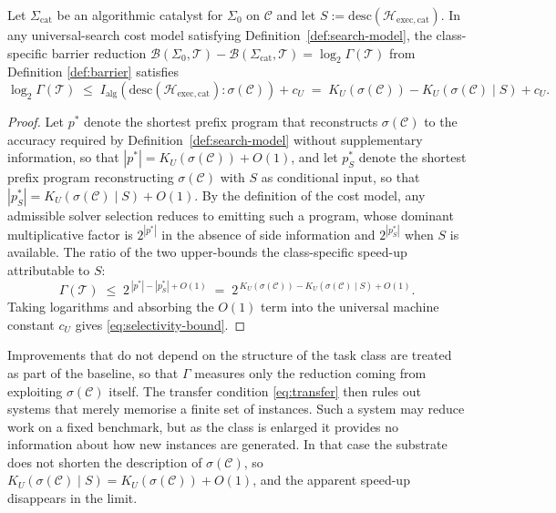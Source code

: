 \documentclass[runningheads]{llncs}
\newcommand{\Sys}{\Sigma}
\newcommand{\Hw}{\mathcal{H}}
\newcommand{\Task}{\mathcal{T}}
\newcommand{\Class}{\mathcal{C}}
\newcommand{\Barrier}{\mathcal{B}}
\newcommand{\descop}{\mathrm{desc}}
\newcommand{\MutInfo}{I_{\mathrm{alg}}}
\begin{document}
\begin{theorem}
\label{thm:selectivity}
Let $\Sys_{\mathrm{cat}}$ be an algorithmic catalyst for $\Sys_0$ on
$\Class$ and let $S:=\descop(\Hw_{\mathrm{exec,cat}})$. In any
universal-search cost model satisfying Definition~\ref{def:search-model},
the class-specific barrier reduction
$\Barrier(\Sys_0,\Task)-\Barrier(\Sys_{\mathrm{cat}},\Task)
= \log_2\Gamma(\Task)$ from Definition \ref{def:barrier} satisfies
\begin{equation}
\label{eq:selectivity-bound}
\log_2\Gamma(\Task)\;\le\;
\MutInfo(\descop(\Hw_{\mathrm{exec,cat}}):\sigma(\Class))+c_U
\;=\;K_U(\sigma(\Class))-K_U(\sigma(\Class)\mid S)+c_U.
\end{equation}
\end{theorem}
\begin{proof}
Let $p^*$ denote the shortest prefix program that reconstructs
$\sigma(\Class)$ to the accuracy required by
Definition~\ref{def:search-model} without supplementary information, so that
$|p^*|=K_U(\sigma(\Class))+O(1)$, and let $p^*_S$ denote the shortest
prefix program reconstructing $\sigma(\Class)$ with $S$ as conditional
input, so that $|p^*_S|=K_U(\sigma(\Class)\mid S)+O(1)$. By the
definition of the cost model, any admissible solver selection
reduces to emitting such a program, whose dominant multiplicative
factor is $2^{|p^*|}$ in the absence of side information and
$2^{|p^*_S|}$ when $S$ is available. The ratio of the two upper-bounds
the class-specific speed-up attributable to $S$:
\begin{equation}
\Gamma(\Task)\;\le\;2^{\,|p^*|-|p^*_S|+O(1)}
\;=\;2^{\,K_U(\sigma(\Class))-K_U(\sigma(\Class)\mid S)+O(1)}.
\end{equation}
Taking logarithms and absorbing the $O(1)$ term into the universal machine constant $c_U$ gives
\eqref{eq:selectivity-bound}. 
\end{proof}
Improvements that do not depend on the structure of the task class are
treated as part of the baseline, so that $\Gamma$ measures only the
reduction coming from exploiting $\sigma(\Class)$ itself. The transfer
condition \eqref{eq:transfer} then rules out systems that merely
memorise a finite set of instances. Such a system may reduce work on a
fixed benchmark, but as the class is enlarged it provides no
information about how new instances are generated. In that case the
substrate does not shorten the description of $\sigma(\Class)$,
so $K_U(\sigma(\Class)\mid S)=K_U(\sigma(\Class))+O(1)$, and the
apparent speed-up disappears in the limit.
\end{document}
